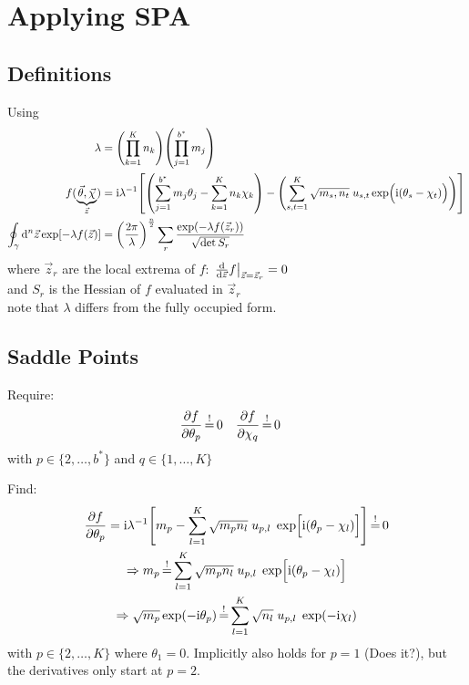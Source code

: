\documentclass[
	english,
	a4paper,
	fontsize=10pt,
	parskip=half,
	titlepage=true,
	DIV=12,
	final
]{scrreprt}
\newcommand*{\Thus}{\ensuremath{\Rightarrow}\xspace}
\newcommand*{\iunit}{\ensuremath{\mathrm{i}}}
\newcommand*{\equalCond}{  \mathop{=}\limits^!  }
\begin{document}
\section{Applying SPA}
\subsection{Definitions}
Using
\begin{align}
	\lambda
&=
	\qty( \prod_{k=1}^{K}   n_k )
	\qty( \prod_{j=1}^{b^*} m_j )
\label{eqn:DefLambda_m}
\\
	f(
		\underbrace{ \vec{\theta}, \vec{\chi} }_{\vec{z}}
	)
&=
	\iunit
	\lambda^{-1}
	\qty[
		\qty(
			\sum_{j=1}^{b^*}
				m_j \theta_j   -
			\sum_{k=1}^{K}
				n_k \chi  _k
		)
	-
		\qty(
			\sum_{s,t=1}^{K}
			\sqrt{m_s, n_t} \;
			u_{s,t}
			\exp(\Big.
				\iunit(\theta_s - \chi_t)
			)
		)
	]
\\
	\oint_{\gamma} \dd[n]{\vec{z}}
		\exp[-\lambda f(\vec{z})]
&=
	\qty( \frac
		{2\pi}
		{\lambda}
	)^{\frac{n}{2}}
	\sum_{r}
		\frac
		{\exp(-\lambda f(\vec{z}_r))}
		{\sqrt{\det S_r}}
\label{eqn:Def_SPA}
\end{align}
where $\vec{z}_r$ are the local extrema of $f$: $\eval{\dv{\vec{z}}f}_{\vec{z} = \vec{z}_r} = 0$\\
and $S_r$ is the Hessian of $f$ evaluated in $\vec{z}_r$\\
{\color{red} note that $\lambda$ differs from the fully occupied form.}

\subsection{Saddle Points}
\label{sec:saddles}
Require:
\begin{align}
	\pdv{f}{\theta_p} &\equalCond 0
&
	\pdv{f}{\chi  _q} &\equalCond 0 
\end{align}
with $p \in \{2, \ldots, b^*\}$ and $q \in \{1, \ldots, K\}$

Find:
\begin{gather}
	\pdv{f}{\theta_p}
=
	\iunit \lambda^{-1}
	\qty[
		m_p
		-
		\sum_{l=1}^{K}
			\sqrt{m_p n_l} \; u_{p,l} \; \exp[ \Big. \iunit(\theta_p - \chi_l)]
	]
	\label{eqn:Jacobiantheta_m}
\equalCond
	0 \\
\Thus
	m_p
\equalCond
	\sum_{l=1}^{K}
		\sqrt{m_p n_l} \; u_{p,l} \; \exp[ \Big. \iunit(\theta_p - \chi_l) ] \\
\Thus
	\sqrt{m_p} \exp(-\iunit \theta_p)
\equalCond
	\sum_{l=1}^{K} \sqrt{n_l} \; u_{p,l} \; \exp(-\iunit\chi_l)
	\label{eqn:FourierLinkForward_m}
\end{gather}
with $p \in \{2, \ldots, K\}$ where $\theta_1 = 0$. Implicitly also holds for $p=1$ {\color{red}(Does it?)}, but the derivatives only start at $p=2$.
\end{document}
